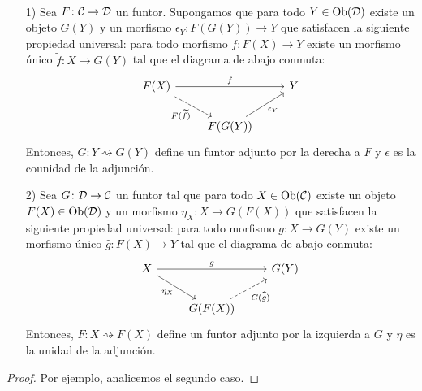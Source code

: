 \documentclass{article}
\numberwithin{equation}{section}
\theoremstyle{definition}
\begin{document}
\begin{proposicion}
  ~

  \begin{enumerate}
  \item[1)] Sea $F\colon \mathcal{C}\to\mathcal{D}$ un funtor. Supongamos que para
    todo $Y\in\operatorname{Ob} (\mathcal{D})$ existe un objeto $G (Y)$ y un morfismo
    $\epsilon_Y\colon F (G (Y)) \to Y$ que satisfacen la siguiente propiedad
    universal: para todo morfismo $f\colon F (X) \to Y$ existe un morfismo único
    $\widetilde{f}\colon X\to G (Y)$ tal que el diagrama de abajo conmuta:
    \[ \begin{tikzcd}
        F (X) \ar{rr}{f}\ar[dashed]{dr}[swap]{F (\widetilde{f})} && Y \\
        & F (G (Y))\ar{ur}[swap]{\epsilon_Y}
      \end{tikzcd} \]
    Entonces, $G\colon Y\rightsquigarrow G (Y)$ define un funtor adjunto por la
    derecha a $F$ y $\epsilon$ es la counidad de la adjunción.

  \item[2)] Sea $G\colon \mathcal{D}\to\mathcal{C}$ un funtor tal que para todo
    $X\in \operatorname{Ob} (\mathcal{C})$ existe un objeto $F (X)\in \operatorname{Ob} (\mathcal{D})$ y un
    morfismo $\eta_X\colon X\to G (F (X))$ que satisfacen la siguiente propiedad
    universal: para todo morfismo $g\colon X \to G (Y)$ existe un morfismo único
    $\widehat{g}\colon F (X) \to Y$ tal que el diagrama de abajo conmuta:
    \[ \begin{tikzcd}
        X \ar{rr}{g}\ar{dr}[swap]{\eta_X} && G (Y) \\
        & G (F (X))\ar[dashed]{ur}[swap]{G (\widehat{g})}
      \end{tikzcd} \]
    Entonces, $F\colon X\rightsquigarrow F (X)$ define un funtor adjunto por la
    izquierda a $G$ y $\eta$ es la unidad de la adjunción.
  \end{enumerate}

  \begin{proof}
    Por ejemplo, analicemos el segundo caso.


\end{proof}
\end{proposicion}
\end{document}

